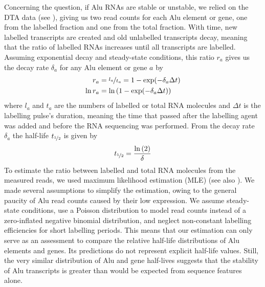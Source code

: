 Concerning\label{mar:alumle} the question,
if Alu RNAs are stable or unstable, we relied on the DTA data (see
), giving us two read counts for each Alu
element or gene, one from the labelled fraction and one from the total
fraction. With time, new labelled transcripts are created and old unlabelled
transcripts decay, meaning that the ratio of labelled RNAs increases until all
transcripts are labelled. Assuming exponential decay and steady-state
conditions, this ratio $r_{a}$ gives us the decay rate $\delta{}_{a}$ for any
Alu element or gene $a$ by
\begin{align*}
       r_{a} &= \nicefrac{l_{a}}{t_{a}}=1-\exp(-\delta_{a}\Delta t)
\\ \ln r_{a} &= \ln\left(1-\exp(-\delta_{a}\Delta t)\right)
\end{align*}
where $l_{a}$ and $t_{a}$ are the numbers of labelled or total RNA molecules
and $\Delta{}t$ is the labelling pulse’s duration, meaning the time that
passed after the labelling agent was added and before the RNA sequencing was
performed. From the decay rate $\delta{}_{a}$ the half-life
$t_{\nicefrac{1}{2}}$ is given by
\begin{align*}
t_{\nicefrac{1}{2}}=\frac{\ln\left(2\right)}{\delta}
\end{align*}
To estimate the ratio between labelled and total RNA molecules from the
measured reads, we used maximum likelihood estimation (MLE) \citep{Rossi2018}
(see also ). We made several assumptions to simplify
the estimation, owing to the general paucity of Alu read counts caused by
their low expression. We assume steady-state conditions, use a Poisson
distribution to model read counts instead of a zero-inflated negative binomial
distribution, and neglect non-constant labelling efficiencies for short
labelling periods. This means that our estimation can only serve as an
assessment to compare the relative half-life distributions of Alu elements and
genes. Its predictions do not represent explicit half-life values. Still, the
very similar distribution of Alu and gene half-lives suggests that the
stability of Alu transcripts is greater than would be expected from sequence
features alone.
\bigbreak

